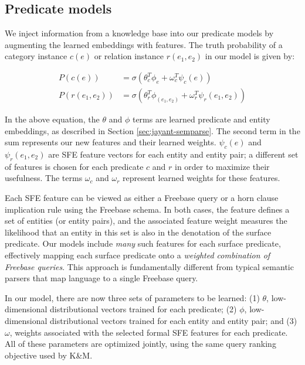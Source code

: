 \documentclass[11pt]{article}
\begin{document}
\subsection{Predicate models}
\label{sec:formal-and-distributional}


We inject information from a knowledge base into our predicate models
by augmenting the learned embeddings with features. The truth
probability of a category instance $c(e)$ or relation instance $r(e_1,
e_2)$ in our model is given by:

\begin{align*}
  P(c(e)) &= \sigma ( \theta_c^T \phi_e + \omega_c^T \psi_c(e)) \\
  P(r(e_1, e_2)) &= \sigma ( \theta_r^T \phi_{(e_1, e_2)} + \omega_r^T \psi_r(e_1, e_2) )
\end{align*}

In the above equation, the $\theta$ and $\phi$ terms are learned
predicate and entity embeddings, as described in Section
\ref{sec:jayant-semparse}. The second term in the sum represents our
new features and their learned weights. $\psi_c(e)$ and $\psi_r(e_1,
e_2)$ are SFE feature vectors for each entity and entity pair; a
different set of features is chosen for each predicate $c$ and $r$ in
order to maximize their usefulness. The terms $\omega_c$ and
$\omega_r$ represent learned weights for these features.

Each SFE feature can be viewed as either a Freebase query or a horn
clause implication rule using the Freebase schema. In both cases, the
feature defines a set of entities (or entity pairs), and the
associated feature weight measures the likelihood that an entity in
this set is also in the denotation of the surface predicate. Our
models include \emph{many} such features for each surface predicate,
effectively mapping each surface predicate onto a \emph{weighted
  combination of Freebase queries}. This approach is fundamentally
different from typical semantic parsers that map language to a single
Freebase query.

In our model, there are now three sets of parameters to be learned:
(1) $\theta$, low-dimensional distributional vectors trained for each
predicate; (2) $\phi$, low-dimensional distributional vectors trained
for each entity and entity pair; and (3) $\omega$, weights associated
with the selected formal SFE features for each predicate.  All of
these parameters are optimized jointly, using the same query ranking
objective used by K\&M.
\end{document}
